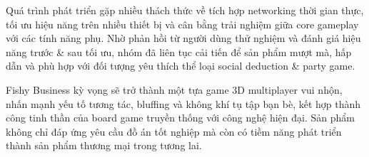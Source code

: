 Quá trình phát triển gặp nhiều thách thức về tích hợp networking thời gian thực, tối ưu hiệu năng trên nhiều thiết bị và cân bằng trải nghiệm giữa core gameplay với các tính năng phụ. Nhờ phản hồi từ người dùng thử nghiệm và đánh giá hiệu năng trước \& sau tối ưu, nhóm đã liên tục cải tiến để sản phẩm mượt mà, hấp dẫn và phù hợp với đối tượng yêu thích thể loại social deduction \& party game.
\bigskip

Fishy Business kỳ vọng sẽ trở thành một tựa game 3D multiplayer vui nhộn, nhấn mạnh yếu tố tương tác, bluffing và không khí tụ tập bạn bè, kết hợp thành công tinh thần của board game truyền thống với công nghệ hiện đại. Sản phẩm không chỉ đáp ứng yêu cầu đồ án tốt nghiệp mà còn có tiềm năng phát triển thành sản phẩm thương mại trong tương lai.
